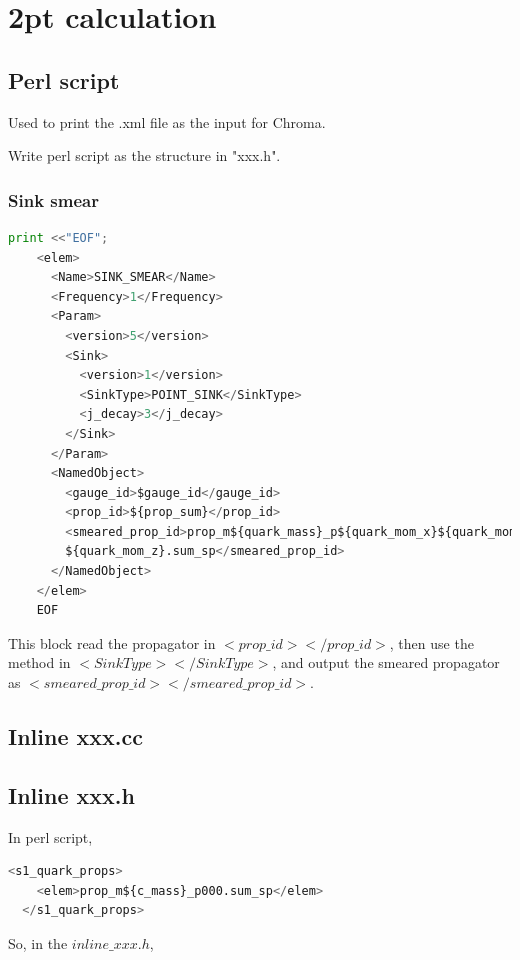 \documentclass{article}
\begin{document}
\section{2pt calculation}

\subsection{Perl script}

Used to print the .xml file as the input for Chroma.

Write perl script as the structure in "xxx.h".


\subsubsection{Sink smear}

\begin{lstlisting}[language=Python]
    print <<"EOF";
    <elem>
      <Name>SINK_SMEAR</Name>
      <Frequency>1</Frequency>
      <Param>
        <version>5</version>
        <Sink>
          <version>1</version>
          <SinkType>POINT_SINK</SinkType>
          <j_decay>3</j_decay>
        </Sink>
      </Param>
      <NamedObject>
        <gauge_id>$gauge_id</gauge_id>
        <prop_id>${prop_sum}</prop_id> 
        <smeared_prop_id>prop_m${quark_mass}_p${quark_mom_x}${quark_mom_y}
        ${quark_mom_z}.sum_sp</smeared_prop_id>
      </NamedObject>
    </elem>
    EOF
\end{lstlisting}

This block read the propagator in $<prop\_id> </prop\_id>$, then use the method in $<SinkType> </SinkType>$, and output the smeared propagator as $<smeared\_prop\_id> </smeared\_prop\_id>$.


\subsection{Inline xxx.cc}



\subsection{Inline xxx.h}
In perl script,

\begin{lstlisting}[language=Python]
    <s1_quark_props>
    <elem>prop_m${c_mass}_p000.sum_sp</elem>
  </s1_quark_props>
\end{lstlisting}

So, in the $inline\_xxx.h$,
\end{document}
